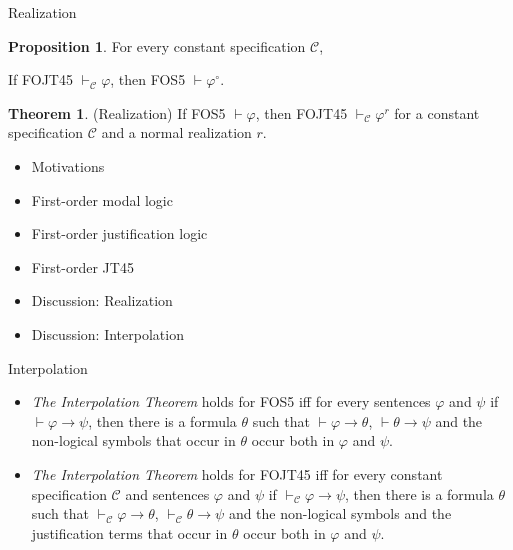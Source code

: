 \documentclass{beamer}
\theoremstyle{definition}
\newtheorem{teor}{Theorem}
\newtheorem{pro}{Proposition}
\newcommand{\C}{\mathcal{C}}
\newcommand{\impli}{\rightarrow}
\newcommand{\teo}{\vdash}
\begin{document}
\begin{frame}{Realization}

\begin{pro}
For every constant specification $\C$,
\begin{center}
If FOJT45 $\teo_{\C} \varphi$, then FOS5 $\teo \varphi^{\circ}$.
\end{center}
\end{pro}	

\begin{teor}
(Realization) If FOS5 $\teo \varphi$, then FOJT45 $\teo_{\C} \varphi^{r}$ for a constant specification $\C$ and a normal realization $r$.
\end{teor}	
\end{frame}



\begin{frame}
	\begin{itemize}
		\item[] Motivations
		\vspace{5mm}	
		\item[] First-order modal logic
		\vspace{5mm}
		\item[] First-order justification logic
		\vspace{5mm}
		\item[] First-order JT45
		\vspace{5mm}
		\item[] Discussion: Realization
		\vspace{5mm}
		\item[] {\color{blue}Discussion: Interpolation}
	\end{itemize} 
\end{frame}




\begin{frame}{Interpolation}


\begin{itemize}

\item \textit{The Interpolation Theorem} holds for FOS5 iff for every sentences $\varphi$ and $\psi$  if $\teo \varphi \impli\psi$, then there is a formula $\theta$ such that $\teo \varphi \impli \theta$, $\teo \theta \impli \psi$ and the non-logical symbols that occur in $\theta$ occur both in $\varphi$ and $\psi$.
\vspace{5mm}
\item \textit{The Interpolation Theorem} holds for FOJT45 iff for every constant specification $\C$ and sentences $\varphi$ and $\psi$ if $\teo_{\C} \varphi \impli\psi$, then there is a formula $\theta$ such that $\teo_{\C} \varphi \impli \theta$, $\teo_{\C} \theta \impli \psi$ and the non-logical symbols and the justification terms that occur in $\theta$ occur both in $\varphi$ and $\psi$.
\end{itemize}
	
\end{frame}
\end{document}
